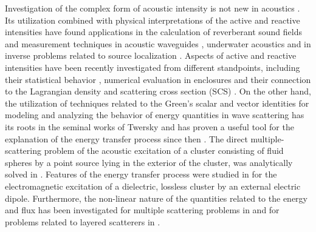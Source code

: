 \documentclass{article}
\begin{document}
Investigation of the complex form of acoustic intensity is not new in acoustics \cite{Jacobsen-1991}. Its utilization combined with physical interpretations of the active and reactive intensities \cite{JASA2, Stanzial} have found applications in the calculation of reverberant sound fields \cite{Nolan} and measurement techniques in acoustic waveguides \cite{JASA}, underwater acoustics \cite{Zhang} and in inverse problems related to source localization \cite{Aramini, Chardon}. Aspects of active and reactive intensities have been recently investigated from different standpoints, including their statistical behavior \cite{Jacobsen}, numerical evaluation in enclosures \cite{Meissner} and their connection to the Lagrangian density and scattering cross section (SCS) \cite{PRSA}. On the other hand, the utilization of techniques related to the Green's scalar and vector identities for modeling and analyzing the behavior of energy quantities in wave scattering has its roots in the seminal works of Twersky \cite{Twersky} and has proven a useful tool for the explanation of the energy transfer process since then \cite{Spyropoulos,Tsitsas-SAPM, SAPM, Marston}. The direct multiple-scattering problem of the acoustic excitation of a cluster consisting of fluid spheres by a point source lying in the exterior of the cluster, was analytically solved in \cite{Wu}. Features of the energy transfer process were studied in \cite{RSL} for the electromagnetic excitation of a dielectric, lossless cluster by an external electric dipole. Furthermore, the non-linear nature of the quantities related to the energy and flux has been investigated for multiple scattering problems in \cite{PRSA, Martin, Martin2} and for problems related to layered scatterers in \cite{QAM1}. 
     
\end{document}
